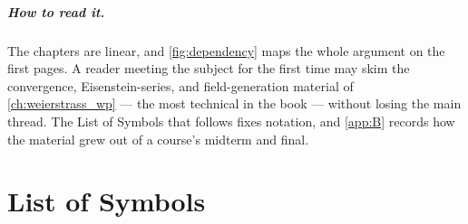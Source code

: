 \documentclass[11pt]{book}
\begin{document}
\paragraph{How to read it.}
The chapters are linear, and \cref{fig:dependency} maps the whole argument on the
first pages. A reader meeting the subject for the first time may skim the
convergence, Eisenstein-series, and field-generation material of
\cref{ch:weierstrass_wp} --- the most technical in the book --- without losing the
main thread. The List of Symbols that follows fixes notation, and \cref{app:B}
records how the material grew out of a course's midterm and final.

\tableofcontents

\chapter*{List of Symbols}
\end{document}
